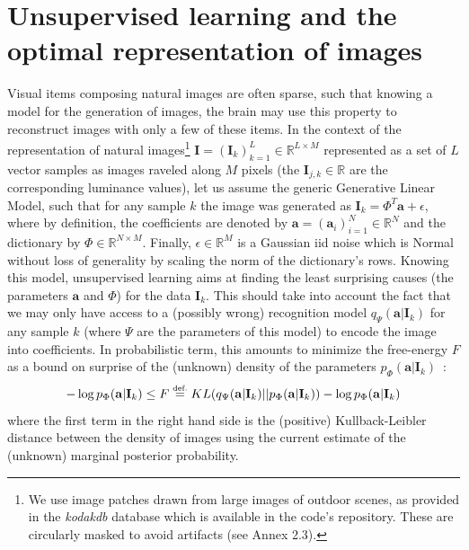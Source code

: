 \documentclass[draft]{article} %
\newcommand{\coef}{\mathbf{a}} %
\newcommand{\image}{\mathbf{I}} %
\newcommand{\dico}{\Phi} %
\newcommand{\eqdef}{\ensuremath{\stackrel{\mbox{\upshape\tiny def.}}{=}}}
\newcommand{\RR}{\mathbb{R}}
\begin{document}
\section{Unsupervised learning and the optimal representation of images}%
%
Visual items composing natural images are often sparse, such that knowing a model for the generation of images, the brain may use this property to reconstruct images with only a few of these items.
In the context of the representation of natural images\footnote{We use image patches drawn from large images of outdoor scenes, as provided in the \emph{kodakdb} database which is available in the code's repository. These are circularly masked to avoid artifacts (see Annex 2.3).} $\image = (\image_k)_{k=1}^L \in \RR^{L \times M}$ represented as a set of $L$ vector samples as images raveled along $M$ pixels (the $\image_{j, k} \in \RR$ are the corresponding luminance values), let us assume the generic Generative Linear Model, such that for any sample $k$ the image was generated as $\image_k = \dico^T \coef + \epsilon $, where by definition, the coefficients are denoted by $\coef = (\coef_i)_{i=1}^N \in \RR^{N}$ and the dictionary by $\dico \in \RR^{N \times M}$. Finally, $\epsilon \in \RR^{M}$ is a Gaussian iid noise which is Normal without loss of generality by scaling the norm of the dictionary's rows. Knowing this model, unsupervised learning aims at finding the least surprising causes (the parameters $\coef$ and $\dico$) for the data $\image_k$. This should take into account the fact that we may only have access to a (possibly wrong) recognition model $q_\Psi(\coef | \image_k)$ for any sample $k$ (where $\Psi$ are the parameters of this model) to encode the image into coefficients. In probabilistic term, this amounts to minimize the free-energy $F$ as a bound on surprise of the (unknown) density of the parameters $p_\dico( \coef | \image_k)$~\citep{Friston12,Kingma13,Doersch2016}:
\begin{equation} -\log p_\dico( \coef | \image_k) \leq F \eqdef KL( q_\Psi(\coef | \image_k) || p_\dico( \coef | \image_k) )  -\log p_\dico( \coef | \image_k) \end{equation}
where the first term in the right hand side is the (positive) Kullback-Leibler distance between the density of images using the current estimate of the (unknown) marginal posterior probability.
\end{document}
